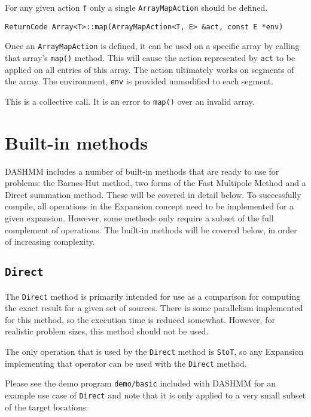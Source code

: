 For any given action \texttt{f} only a single \texttt{ArrayMapAction}
should be defined.

\begin{lstlisting}
ReturnCode Array<T>::map(ArrayMapAction<T, E> &act, const E *env)
\end{lstlisting}

\noindent Once an \texttt{ArrayMapAction} is defined, it can be used on a
specific array
by calling that array's \texttt{map()} method. This will cause the action
represented by \texttt{act} to be applied on all entries of this array. The
action ultimately works on segments of the array. The environment, \texttt{env}
is provided unmodified to each segment.

This is a collective call. It is an error to \texttt{map()} over an invalid array.


\section{Built-in methods}
\label{sec:bi-met}

DASHMM includes a number of built-in methods that are ready to use for
problems: the Barnes-Hut method, two forms of the Fast Multipole Method and
a Direct summation method. These will be covered in detail below. To
successfully compile, all operations in the Expansion concept need to be
implemented for a given expansion. However, some methods only require a
subset of the full complement of operations. The built-in methods will be
covered below, in order of increasing complexity.

\subsection{\texttt{Direct}}

The \texttt{Direct} method is primarily intended for use as a comparison for
computing
the exact result for a given set of sources. There is some parallelism
implemented for this method, so the execution time is reduced somewhat.
However, for realistic problem sizes, this method should not be used.

The only operation that is used by the \texttt{Direct} method is
\texttt{StoT}, so any Expansion implementing that operator can be used with the
\texttt{Direct} method.

Please see the demo program \texttt{demo/basic} included with DASHMM for an
example use case of \texttt{Direct} and note that it is only applied to a very
small subset of the target locations.

